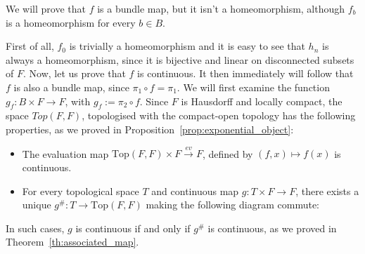 \begin{example}
\begin{center}
\end{center}
We will prove that $f$ is a bundle map, but it isn't a homeomorphism, although $f_b$ is a homeomorphism for every $b\in B$.

First of all, $f_0$ is trivially a homeomorphism and it is easy to see that $h_n$ is always a homeomorphism, since it is bijective and linear on disconnected subsets of $F$. Now, let us prove that $f$ is continuous. It then immediately will follow that $f$ is also a bundle map, since $\pi_1\circ f=\pi_1$. We will first examine the function $g_f:B\times F\to F$, with $g_f:=\pi_2\circ f$. Since $F$ is Hausdorff and locally compact, the space $Top(F,F)$, topologised with the compact-open topology has the following properties, as we proved in Proposition~\ref{prop:exponential_object}:
\begin{itemize}
\item The evaluation map $\mathrm{Top}(F,F)\times F\overset{ev}{\to}F$, defined by $(f,x)\mapsto f(x)$ is continuous.
\item For every topological space $T$ and continuous map $g:T\times F\to F$, there exists a unique $g^{\#}:T\to\mathrm{Top}(F,F)$ making the following diagram commute:
\begin{center}
\end{center}
\end{itemize}
In such cases, $g$ is continuous if and only if $g^{\#}$ is continuous, as we proved in Theorem~\ref{th:associated_map}.


\end{example}
